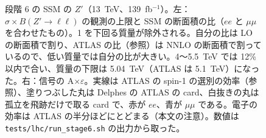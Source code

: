 \documentclass[a4paper,10pt]{ltjsarticle}
\begin{document}
\begin{figure}[tbp]
\caption{段階 6 の SSM の $Z'$（13~TeV、139~fb$^{-1}$）。左：$\sigma\times B(Z'\to\ell\ell)$ の観測の上限と SSM の断面積の比（$ee$ と $\mu\mu$ を合わせたもの）。1 を下回る質量が除外される。自分の比は LO の断面積で割り、ATLAS の比（参照）は NNLO の断面積で割っているので、低い質量では自分の比が大きい。4〜5.5~TeV では 12\% 以内で合い、質量の下限は 5.04~TeV（ATLAS は 5.1~TeV）になった。右：信号の A$\times\varepsilon$。実線は ATLAS の spin-1 の選別の効率（参照）、塗りつぶした丸は Delphes の ATLAS の card、白抜きの丸は孤立を飛跡だけで取る card で、赤が $ee$、青が $\mu\mu$ である。電子の効率は ATLAS の半分ほどにとどまる（本文の注意）。数値は \nolinkurl{tests/lhc/run_stage6.sh} の出力から取った。}
\label{fig:zprime}
\end{figure}
\end{document}
